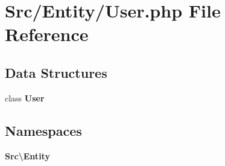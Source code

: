 \section{Src/\+Entity/\+User.php File Reference}
\label{_user_8php}
\subsection*{Data Structures}
\begin{DoxyCompactItemize}
\item 
class \textbf{ User}
\end{DoxyCompactItemize}
\subsection*{Namespaces}
\begin{DoxyCompactItemize}
\item 
 \textbf{ Src\textbackslash{}\+Entity}
\end{DoxyCompactItemize}
